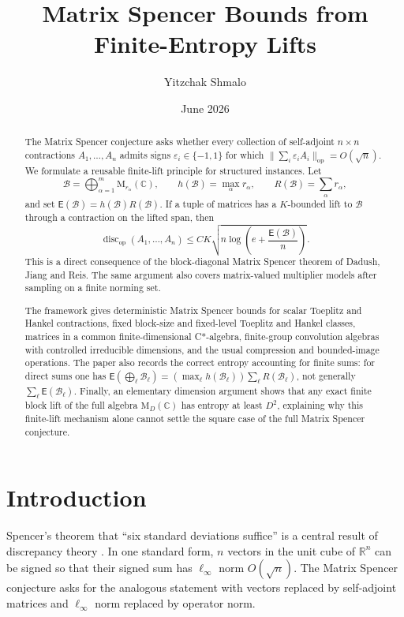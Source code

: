 \documentclass[11pt]{amsart}
\title[Matrix Spencer bounds from finite-entropy lifts]{Matrix Spencer Bounds from Finite-Entropy Lifts}
\author{Yitzchak Shmalo}
\date{June 2026}
\numberwithin{equation}{section}
\theoremstyle{definition}
\theoremstyle{remark}
\newcommand{\C}{\mathbb C}
\newcommand{\R}{\mathbb R}
\newcommand{\M}{\mathrm M}
\newcommand{\op}{\mathrm{op}}
\newcommand{\discop}{\operatorname{disc}_{\op}}
\newcommand{\Ent}{\mathsf E}
\newcommand{\eps}{\varepsilon}
\newcommand{\mcB}{\mathcal B}
\begin{document}
\begin{abstract}
The Matrix Spencer conjecture asks whether every collection of self-adjoint
$n\times n$ contractions $A_1,\ldots,A_n$ admits signs
$\eps_i\in\{-1,1\}$ for which
$\|\sum_i \eps_i A_i\|_{\op}=O(\sqrt n)$. We formulate a reusable
finite-lift principle for structured instances. Let
\[
\mcB=\bigoplus_{\alpha=1}^m \M_{r_\alpha}(\C),\qquad
h(\mcB)=\max_\alpha r_\alpha,\qquad
R(\mcB)=\sum_\alpha r_\alpha,
\]
and set $\Ent(\mcB)=h(\mcB)R(\mcB)$. If a tuple of matrices has a
$K$-bounded lift to $\mcB$ through a contraction on the lifted span, then
\[
\discop(A_1,\ldots,A_n)
\le C K \sqrt{n\log\left(e+\frac{\Ent(\mcB)}{n}\right)} .
\]
This is a direct consequence of the block-diagonal Matrix Spencer theorem of
Dadush, Jiang and Reis. The same argument also covers matrix-valued
multiplier models after sampling on a finite norming set.

The framework gives deterministic Matrix Spencer bounds for scalar Toeplitz
and Hankel contractions, fixed block-size and fixed-level Toeplitz and Hankel classes,
matrices in a common finite-dimensional C*-algebra, finite-group convolution
algebras with controlled irreducible dimensions, and the usual compression and
bounded-image operations. The paper also records the correct entropy accounting
for finite sums: for direct sums one has
$\Ent(\bigoplus_\ell \mcB_\ell)= (\max_\ell h(\mcB_\ell))\sum_\ell R(\mcB_\ell)$,
not generally $\sum_\ell \Ent(\mcB_\ell)$. Finally, an elementary dimension
argument shows that any exact finite block lift of the full algebra $\M_D(\C)$
has entropy at least $D^2$, explaining why this finite-lift mechanism alone
cannot settle the square case of the full Matrix Spencer conjecture.
\end{abstract}

\maketitle

\tableofcontents

\section{Introduction}

Spencer's theorem that ``six standard deviations suffice'' is a central result
of discrepancy theory \cite{Spencer,Matousek,Chazelle}. In one standard form,
$n$ vectors in the unit cube of $\R^n$ can be signed so that their signed sum has
$\ell_\infty$ norm $O(\sqrt n)$. The Matrix Spencer conjecture asks for the
analogous statement with vectors replaced by self-adjoint matrices and
$\ell_\infty$ norm replaced by operator norm.
\end{document}
